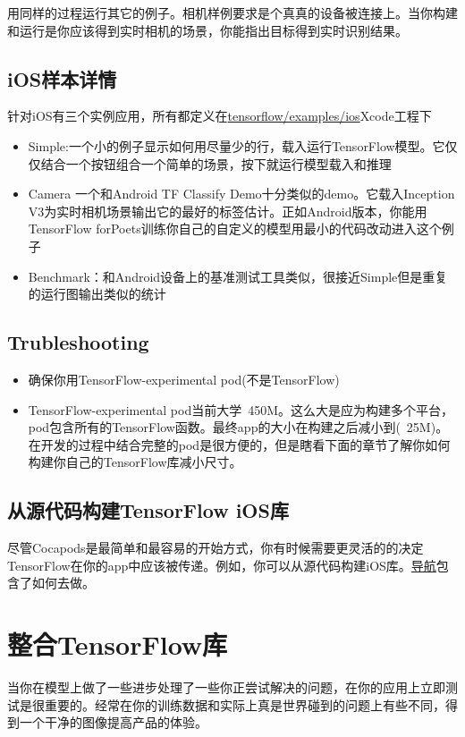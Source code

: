 用同样的过程运行其它的例子。相机样例要求是个真真的设备被连接上。当你构建和运行是你应该得到实时相机的场景，你能指出目标得到实时识别结果。
\subsection{iOS样本详情}
针对iOS有三个实例应用，所有都定义在\href{https://www.github.com/tensorflow/tensorflow/blob/r1.4/tensorflow/examples/ios/}{tensorflow/examples/ios}Xcode工程下
\begin{itemize}
\item Simple:一个小的例子显示如何用尽量少的行，载入运行TensorFlow模型。它仅仅结合一个按钮组合一个简单的场景，按下就运行模型载入和推理
\item Camera 一个和Android TF Classify Demo十分类似的demo。它载入Inception V3为实时相机场景输出它的最好的标签估计。正如Android版本，你能用TensorFlow forPoets训练你自己的自定义的模型用最小的代码改动进入这个例子
\item Benchmark：和Android设备上的基准测试工具类似，很接近Simple但是重复的运行图输出类似的统计
\end{itemize}
\subsection{Trubleshooting}
\begin{itemize}
\item 确保你用TensorFlow-experimental pod(不是TensorFlow)
\item TensorFlow-experimental pod当前大学~450M。这么大是应为构建多个平台，pod包含所有的TensorFlow函数。最终app的大小在构建之后减小到(~25M)。在开发的过程中结合完整的pod是很方便的，但是瞎看下面的章节了解你如何构建你自己的TensorFlow库减小尺寸。
\end{itemize}
\subsection{从源代码构建TensorFlow iOS库}
尽管Cocapods是最简单和最容易的开始方式，你有时候需要更灵活的的决定TensorFlow在你的app中应该被传递。例如，你可以从源代码构建iOS库。\href{https://github.com/tensorflow/tensorflow/tree/master/tensorflow/examples/ios#building-the-tensorflow-ios-libraries-from-source}{导航}包含了如何去做。
\section{整合TensorFlow库}
当你在模型上做了一些进步处理了一些你正尝试解决的问题，在你的应用上立即测试是很重要的。经常在你的训练数据和实际上真是世界碰到的问题上有些不同，得到一个干净的图像提高产品的体验。

